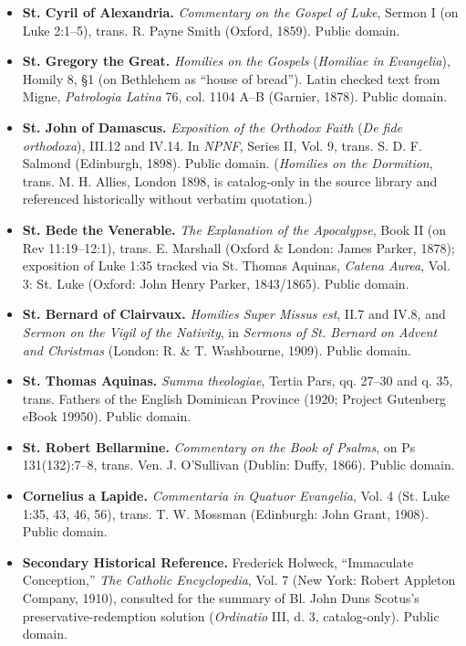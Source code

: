 \begin{itemize}
  \item \textbf{St. Cyril of Alexandria.} \textit{Commentary on the Gospel of Luke}, Sermon I (on Luke 2:1--5), trans. R. Payne Smith (Oxford, 1859). Public domain.
  \item \textbf{St. Gregory the Great.} \textit{Homilies on the Gospels} (\textit{Homiliae in Evangelia}), Homily 8, \S 1 (on Bethlehem as ``house of bread''). Latin checked text from Migne, \textit{Patrologia Latina} 76, col. 1104 A--B (Garnier, 1878). Public domain.
  \item \textbf{St. John of Damascus.} \textit{Exposition of the Orthodox Faith} (\textit{De fide orthodoxa}), III.12 and IV.14. In \textit{NPNF}, Series II, Vol. 9, trans. S. D. F. Salmond (Edinburgh, 1898). Public domain. (\textit{Homilies on the Dormition}, trans. M. H. Allies, London 1898, is catalog-only in the source library and referenced historically without verbatim quotation.)
  \item \textbf{St. Bede the Venerable.} \textit{The Explanation of the Apocalypse}, Book II (on Rev 11:19--12:1), trans. E. Marshall (Oxford \& London: James Parker, 1878); exposition of Luke 1:35 tracked via St. Thomas Aquinas, \textit{Catena Aurea}, Vol. 3: St. Luke (Oxford: John Henry Parker, 1843/1865). Public domain.
  \item \textbf{St. Bernard of Clairvaux.} \textit{Homilies Super Missus est}, II.7 and IV.8, and \textit{Sermon on the Vigil of the Nativity}, in \textit{Sermons of St. Bernard on Advent and Christmas} (London: R. \& T. Washbourne, 1909). Public domain.
  \item \textbf{St. Thomas Aquinas.} \textit{Summa theologiae}, Tertia Pars, qq. 27--30 and q. 35, trans. Fathers of the English Dominican Province (1920; Project Gutenberg eBook 19950). Public domain.
  \item \textbf{St. Robert Bellarmine.} \textit{Commentary on the Book of Psalms}, on Ps 131(132):7--8, trans. Ven. J. O'Sullivan (Dublin: Duffy, 1866). Public domain.
  \item \textbf{Cornelius a Lapide.} \textit{Commentaria in Quatuor Evangelia}, Vol. 4 (St. Luke 1:35, 43, 46, 56), trans. T. W. Mossman (Edinburgh: John Grant, 1908). Public domain.
  \item \textbf{Secondary Historical Reference.} Frederick Holweck, ``Immaculate Conception,'' \textit{The Catholic Encyclopedia}, Vol. 7 (New York: Robert Appleton Company, 1910), consulted for the summary of Bl. John Duns Scotus's preservative-redemption solution (\textit{Ordinatio} III, d. 3, catalog-only). Public domain.
\end{itemize}
